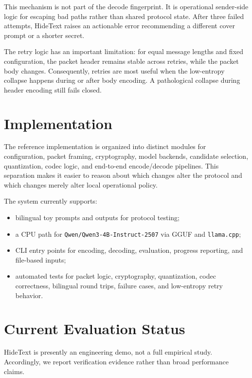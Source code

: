\documentclass[sigconf,review,anonymous]{acmart}
\begin{document}
This mechanism is not part of the decode fingerprint. It is operational sender-side logic for escaping bad paths rather than shared protocol state. After three failed attempts, HideText raises an actionable error recommending a different cover prompt or a shorter secret.

The retry logic has an important limitation: for equal message lengths and fixed configuration, the packet header remains stable across retries, while the packet body changes. Consequently, retries are most useful when the low-entropy collapse happens during or after body encoding. A pathological collapse during header encoding still fails closed.

\section{Implementation}

The reference implementation is organized into distinct modules for configuration, packet framing, cryptography, model backends, candidate selection, quantization, codec logic, and end-to-end encode/decode pipelines. This separation makes it easier to reason about which changes alter the protocol and which changes merely alter local operational policy.

The system currently supports:

\begin{itemize}
    \item bilingual toy prompts and outputs for protocol testing;
    \item a CPU path for \texttt{Qwen/Qwen3-4B-Instruct-2507} via GGUF and \texttt{llama.cpp};
    \item CLI entry points for encoding, decoding, evaluation, progress reporting, and file-based inputs;
    \item automated tests for packet logic, cryptography, quantization, codec correctness, bilingual round trips, failure cases, and low-entropy retry behavior.
\end{itemize}

\section{Current Evaluation Status}

HideText is presently an engineering demo, not a full empirical study. Accordingly, we report verification evidence rather than broad performance claims.
\end{document}
